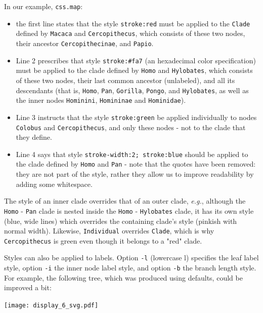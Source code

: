 \noindent{}In our example, \texttt{css.map}:
\begin{itemize}
	\item the first line states that the style \texttt{stroke:red} must be applied
		to the \texttt{Clade} defined by \texttt{Macaca} and
		\texttt{Cercopithecus}, which consists of these two nodes, their ancestor
		\texttt{Cercopithecinae}, and \texttt{Papio}. 
	\item Line 2 prescribes that style \texttt{stroke:\#fa7} (an \svg{}
		hexadecimal color specification) must be applied to the clade defined by
		\texttt{Homo} and \texttt{Hylobates}, which consists of these two nodes,
		their last common ancestor (unlabeled), and all its descendants (that is,
		\texttt{Homo}, \texttt{Pan}, \texttt{Gorilla}, \texttt{Pongo}, and
		\texttt{Hylobates}, as well as the inner nodes \texttt{Hominini},
		\texttt{Homininae} and \texttt{Hominidae}). 
	\item Line 3 instructs that the style \texttt{stroke:green} be applied
		individually to nodes \texttt{Colobus} and \texttt{Cercopithecus}, and only
		these nodes - not to the clade that they define.  
	\item Line 4 says that style \texttt{stroke-width:2;~stroke:blue} should be
		applied to the clade defined by \texttt{Homo} and \texttt{Pan} - note that
		the quotes have been removed: they are not part of the style, rather they
		allow us to improve readability by adding some whitespace.
\end{itemize}

The style of an inner clade overrides that of an outer clade, \textit{e.g.},
although the \texttt{Homo} - \texttt{Pan} clade is nested inside the
\texttt{Homo} - \texttt{Hylobates} clade, it has its own style (blue, wide
lines) which overrides the containing clade's style (pinkish with normal
width).  Likewise, \texttt{Individual} overrides \texttt{Clade}, which is why
\texttt{Cercopithecus} is green even though it belongs to a "red" clade.

\bigskip

Styles can also be applied to labels. Option \texttt{-l} (lowercase l) specifies
the leaf label style, option \texttt{-i} the inner node label style, and option
\texttt{-b} the branch length style. For example, the following tree, which was
produced using defaults, could be improved a bit:


\begin{center}
  \texttt{[image: display\_6\_svg.pdf]}
\end{center}

